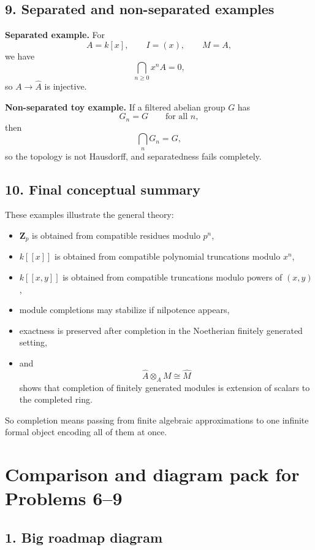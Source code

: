 \documentclass[12pt,a4paper]{article}
\theoremstyle{plain}
\theoremstyle{definition}      %
\begin{document}
\subsection*{9. Separated and non-separated examples}

\textbf{Separated example.}
For
\[
A=k[x],\qquad I=(x),\qquad M=A,
\]
we have
\[
\bigcap_{n\ge0} x^nA=0,
\]
so \(A\to \widehat A\) is injective.

\medskip
\textbf{Non-separated toy example.}
If a filtered abelian group \(G\) has
\[
G_n=G
\qquad\text{for all }n,
\]
then
\[
\bigcap_n G_n=G,
\]
so the topology is not Hausdorff, and separatedness fails completely.

\subsection*{10. Final conceptual summary}

These examples illustrate the general theory:

\begin{itemize}
	\item \(\mathbf Z_p\) is obtained from compatible residues modulo \(p^n\),
	\item \(k[[x]]\) is obtained from compatible polynomial truncations modulo \(x^n\),
	\item \(k[[x,y]]\) is obtained from compatible truncations modulo powers of \((x,y)\),
	\item module completions may stabilize if nilpotence appears,
	\item exactness is preserved after completion in the Noetherian finitely generated setting,
	\item and
	\[
	\widehat A\otimes_A M \cong \widehat M
	\]
	shows that completion of finitely generated modules is extension of scalars to the completed ring.
\end{itemize}

So completion means passing from finite algebraic approximations to one infinite formal object encoding all of them at once.

\section*{Comparison and diagram pack for Problems 6--9}

\subsection*{1. Big roadmap diagram}
\end{document}
